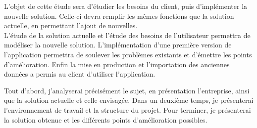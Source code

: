 L'objet de cette étude sera d'étudier les besoins du client, puis d'implémenter la nouvelle solution.
Celle-ci devra remplir les mêmes fonctions que la solution actuelle, en permettant l'ajout de nouvelles.
\\



L'étude de la solution actuelle et l'étude des besoins de l'utilisateur permettra de modéliser la nouvelle solution.
L'implémentation d'une première version de l'application permettra de soulever les problèmes existants et d'émettre les points d'amélioration.
Enfin la mise en production et l'importation des anciennes données a permis au client d'utiliser l'application.


Tout d'abord, j'analyserai précisément le sujet, en présentation l'entreprise, ainsi que la solution actuelle et celle envisagée.
Dans un deuxième temps, je présenterai l'environnement de travail et la structure du projet.
Pour terminer, je présenterai la solution obtenue et les différents points d'amélioration possibles.